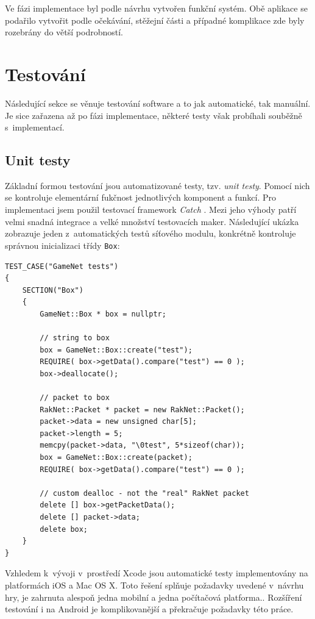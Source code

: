 \documentclass[thesis=B,czech,hidelinks]{FITthesis}[2012/06/26] %
\newcommand{\code}[1]{\texttt{#1}}
\begin{document}
Ve fázi implementace byl podle návrhu vytvořen funkční systém. Obě aplikace se podařilo vytvořit podle očekávání, stěžejní části a případné komplikace zde byly rozebrány do větší podrobností. 


\section{Testování}
\label{section:testing}

Následující sekce se věnuje testování software a to jak automatické, tak manuální. Je sice zařazena až po fázi implementace, některé testy však probíhali souběžně s~implementací. 

\subsection{Unit testy}

Základní formou testování jsou automatizované testy, tzv. \textit{unit testy}. Pomocí nich se kontroluje elementární fukčnost jednotlivých komponent a funkcí. Pro implementaci jsem použil testovací framework \textit{Catch} \cite{catch}. Mezi jeho výhody patří velmi snadná integrace a velké množství testovacích maker. Následující ukázka zobrazuje jeden z~automatických testů síťového modulu, konkrétně kontroluje správnou inicializaci třídy \code{Box}:

\begin{verbatim}
TEST_CASE("GameNet tests")
{
    SECTION("Box") 
    { 
        GameNet::Box * box = nullptr;
        
        // string to box
        box = GameNet::Box::create("test");
        REQUIRE( box->getData().compare("test") == 0 );
        box->deallocate();
        
        // packet to box
        RakNet::Packet * packet = new RakNet::Packet();
        packet->data = new unsigned char[5];
        packet->length = 5;
        memcpy(packet->data, "\0test", 5*sizeof(char));
        box = GameNet::Box::create(packet);
        REQUIRE( box->getData().compare("test") == 0 );
		
        // custom dealloc - not the "real" RakNet packet
        delete [] box->getPacketData();
        delete [] packet->data;
        delete box;
    }
}
\end{verbatim}

Vzhledem k~vývoji v~prostředí Xcode jsou automatické testy implementovány na platformách iOS a Mac OS X. Toto řešení splňuje požadavky uvedené v~návrhu hry, je zahrnuta alespoň jedna mobilní a jedna počítačová platforma.. Rozšíření testování i na Android je komplikovanější a překračuje požadavky této práce.
\end{document}
